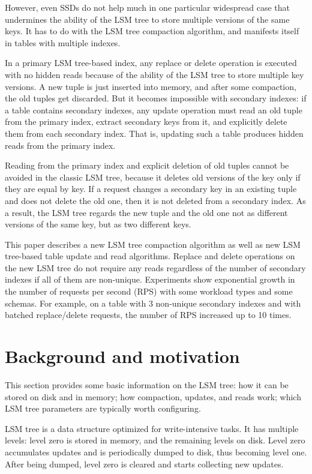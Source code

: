 \documentclass{vldb}
\begin{document}
However, even SSDs do not help much in one particular widespread case that undermines
the ability of the LSM tree to store multiple versions of the same keys. It has to do
with the LSM tree compaction algorithm, and manifests itself in tables with multiple indexes.

In a primary LSM tree-based index, any replace or delete operation is executed
with no hidden reads because of the ability of the LSM tree to store multiple key versions.
A new tuple is just inserted into memory, and after some compaction, the old
tuples get discarded. But it becomes impossible with secondary indexes: if a table
contains secondary indexes, any update operation must read an old tuple from the
primary index, extract secondary keys from it, and explicitly delete them from each
secondary index. That is, updating such a table produces hidden reads from the
primary index.

Reading from the primary index and explicit deletion of old tuples cannot be
avoided in the classic LSM tree, because it deletes old versions of the key only
if they are equal by key. If a request changes a secondary key in an existing
tuple and does not delete the old one, then it is not deleted from a secondary
index. As a result, the LSM tree regards the new tuple and the old one not as
different versions of the same key, but as two different keys.

This paper describes a new LSM tree compaction algorithm as well as new LSM
tree-based table update and read algorithms. Replace and delete operations on the new
LSM tree do not require any reads regardless of the number of secondary indexes 
if all of them are non-unique. Experiments show exponential growth in the number
of requests per second (RPS) with some workload types and some schemas. For example,
on a table with 3 non-unique secondary indexes and with batched replace/delete
requests, the number of RPS increased up to 10 times.

\section{Background and motivation}
This section provides some basic information on the LSM tree: how it can be
stored on disk and in memory; how compaction, updates, and reads work;
which LSM tree parameters are typically worth configuring.

LSM tree is a data structure optimized for write-intensive tasks. It has
multiple levels: level zero is stored in memory, and the remaining levels on disk.
Level zero accumulates updates and is periodically dumped to disk, thus becoming
level one. After being dumped, level zero is cleared and starts collecting new updates.
\end{document}
